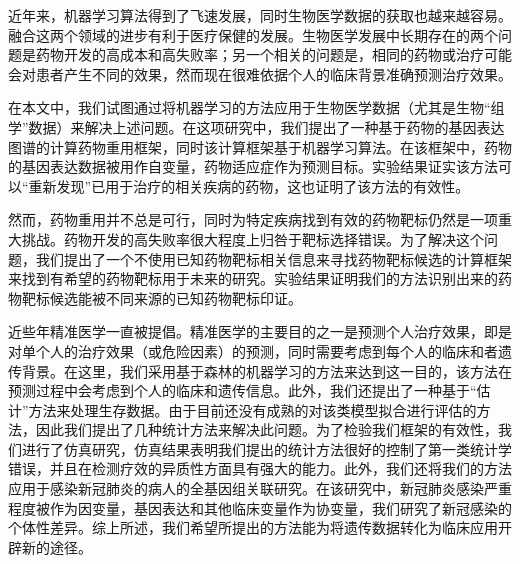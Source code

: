 \newpage
\begin{CJK*}{UTF8}{gbsn}
  近年来，机器学习算法得到了飞速发展，同时生物医学数据的获取也越来越容易。融合这两个领域的进步有利于医疗保健的发展。生物医学发展中长期存在的两个问题是药物开发的高成本和高失败率；另一个相关的问题是，相同的药物或治疗可能会对患者产生不同的效果，然而现在很难依据个人的临床背景准确预测治疗效果。

  在本文中，我们试图通过将机器学习的方法应用于生物医学数据（尤其是生物“组学”数据）来解决上述问题。在这项研究中，我们提出了一种基于药物的基因表达图谱的计算药物重用框架，同时该计算框架基于机器学习算法。在该框架中，药物的基因表达数据被用作自变量，药物适应症作为预测目标。实验结果证实该方法可以“重新发现”已用于治疗的相关疾病的药物，这也证明了该方法的有效性。

  然而，药物重用并不总是可行，同时为特定疾病找到有效的药物靶标仍然是一项重大挑战。药物开发的高失败率很大程度上归咎于靶标选择错误。为了解决这个问题，我们提出了一个不使用已知药物靶标相关信息来寻找药物靶标候选的计算框架来找到有希望的药物靶标用于未来的研究。实验结果证明我们的方法识别出来的药物靶标候选能被不同来源的已知药物靶标印证。
    
  近些年精准医学一直被提倡。精准医学的主要目的之一是预测个人治疗效果，即是对单个人的治疗效果（或危险因素）的预测，同时需要考虑到每个人的临床和者遗传背景。在这里，我们采用基于森林的机器学习的方法来达到这一目的，该方法在预测过程中会考虑到个人的临床和遗传信息。此外，我们还提出了一种基于“估计”方法来处理生存数据。由于目前还没有成熟的对该类模型拟合进行评估的方法，因此我们提出了几种统计方法来解决此问题。为了检验我们框架的有效性，我们进行了仿真研究，仿真结果表明我们提出的统计方法很好的控制了第一类统计学错误，并且在检测疗效的异质性方面具有强大的能力。此外，我们还将我们的方法应用于感染新冠肺炎的病人的全基因组关联研究。在该研究中，新冠肺炎感染严重程度被作为因变量，基因表达和其他临床变量作为协变量，我们研究了新冠感染的个体性差异。综上所述，我们希望所提出的方法能为将遗传数据转化为临床应用开辟新的途径。
\clearpage\end{CJK*}

